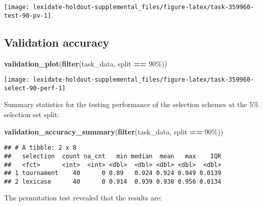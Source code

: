 \documentclass[
]{book}
\newenvironment{Shaded}{\begin{snugshade}}{\end{snugshade}}
\newcommand{\FunctionTok}[1]{\textcolor[rgb]{0.13,0.29,0.53}{\textbf{#1}}}
\newcommand{\NormalTok}[1]{#1}
\newcommand{\SpecialCharTok}[1]{\textcolor[rgb]{0.81,0.36,0.00}{\textbf{#1}}}
\newcommand{\StringTok}[1]{\textcolor[rgb]{0.31,0.60,0.02}{#1}}
\begin{document}
\texttt{[image: lexidate-holdout-supplemental\_files/figure-latex/task-359960-test-90-pv-1]}

\hypertarget{validation-accuracy-48}{%
\subsection{Validation accuracy}\label{validation-accuracy-48}}

\begin{Shaded}
\begin{Highlighting}[]
\FunctionTok{validation\_plot}\NormalTok{(}\FunctionTok{filter}\NormalTok{(task\_data, split }\SpecialCharTok{==} \StringTok{\textquotesingle{}90\%\textquotesingle{}}\NormalTok{))}
\end{Highlighting}
\end{Shaded}

\texttt{[image: lexidate-holdout-supplemental\_files/figure-latex/task-359960-select-90-perf-1]}

Summary statistics for the testing performance of the selection schemes at the 5\% selection set split:

\begin{Shaded}
\begin{Highlighting}[]
\FunctionTok{validation\_accuracy\_summary}\NormalTok{(}\FunctionTok{filter}\NormalTok{(task\_data, split }\SpecialCharTok{==} \StringTok{\textquotesingle{}90\%\textquotesingle{}}\NormalTok{))}
\end{Highlighting}
\end{Shaded}

\begin{verbatim}
## # A tibble: 2 x 8
##   selection  count na_cnt   min median  mean   max    IQR
##   <fct>      <int>  <int> <dbl>  <dbl> <dbl> <dbl>  <dbl>
## 1 tournament    40      0 0.89   0.924 0.924 0.949 0.0139
## 2 lexicase      40      0 0.914  0.939 0.938 0.956 0.0134
\end{verbatim}

The permutation test revealed that the results are:
\end{document}
